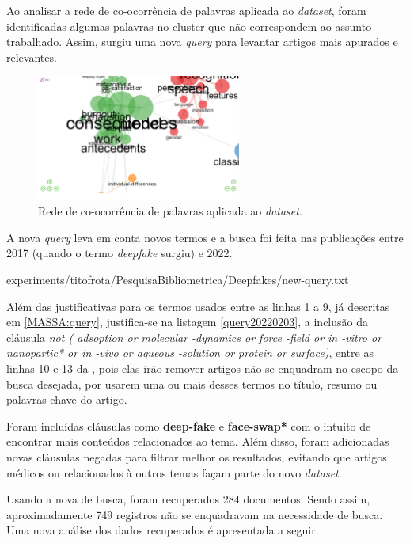 Ao analisar a rede de co-ocorrência de palavras aplicada ao \textit{dataset}, foram identificadas algumas palavras no cluster que não correspondem ao assunto trabalhado. Assim, surgiu uma nova \textit{query} para levantar artigos mais apurados e relevantes.

\begin{figure}[htp]
    \centering
    \includegraphics[width=0.6\textwidth]{experiments/titofrota/PesquisaBibliometrica/Deepfakes/co-ocurrence.png}
    \caption{Rede de co-ocorrência de palavras aplicada ao \textit{dataset}.}
    \label{fig:DEEPFAKES@titofrota:redecoocorrencia}
\end{figure}

A nova \textit{query} leva em conta novos termos e a busca foi feita nas publicações entre 2017 (quando o termo \textit{deepfake} surgiu) e 2022.


{experiments/titofrota/PesquisaBibliometrica/Deepfakes/new-query.txt}


Além das justificativas para os termos usados entre as linhas 1 a 9, já descritas em \ref{MASSA:query},  justifica-se na listagem \ref{query20220203}, a inclusão da cláusula \textit{not (
 adsoption or molecular -dynamics or force -field
 or in -vitro or nanopartic* or in -vivo
 or aqueous -solution or protein or surface)}, entre as linhas 10 e 13 da \query, pois elas irão remover artigos não se enquadram no escopo da busca desejada, por usarem uma ou mais desses termos no título, resumo ou palavras-chave do artigo.
 
 Foram incluídas cláusulas como \textbf{deep-fake} e \textbf{face-swap*} com o intuito de encontrar mais conteúdos relacionados ao tema. Além disso, foram adicionadas novas cláusulas negadas para filtrar melhor os resultados, evitando que artigos médicos ou relacionados à outros temas façam parte do novo \textit{dataset}.
 
Usando a nova \textit{} de busca, foram recuperados 284 documentos. Sendo assim, aproximadamente 749 registros não se enquadravam na necessidade de busca.
Uma nova análise dos dados recuperados é apresentada a seguir.

